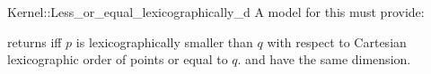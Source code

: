 \begin{ccRefFunctionObjectConcept}{Kernel::Less_or_equal_lexicographically_d}
A model for this must provide:


 {returns  iff $p$ is
  lexicographically smaller than $q$ with respect to Cartesian
  lexicographic order of points or equal to $q$. \ccPrecond {}
  and  have the same dimension.}

\end{ccRefFunctionObjectConcept}
